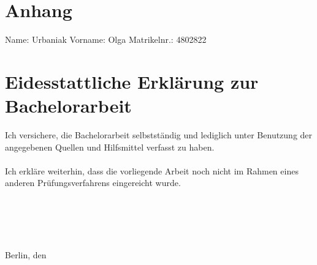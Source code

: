 \section{Anhang}
\vspace{6cm}
Name: Urbaniak \hfill Vorname: Olga \hfill Matrikelnr.: 4802822
\section*{Eidesstattliche Erklärung zur Bachelorarbeit}
\vspace{2cm}
Ich versichere, die Bachelorarbeit selbstständig und lediglich unter Benutzung der angegebenen Quellen und Hilfsmittel verfasst zu haben.
\\\\
Ich erkläre weiterhin, dass die vorliegende Arbeit noch nicht im Rahmen eines anderen Prüfungsverfahrens eingereicht wurde.
\\\\
\\\\
\\\\
Berlin, den \thesisDate
\clearpage
\pagestyle{fancy}
\fancyhf{} %
